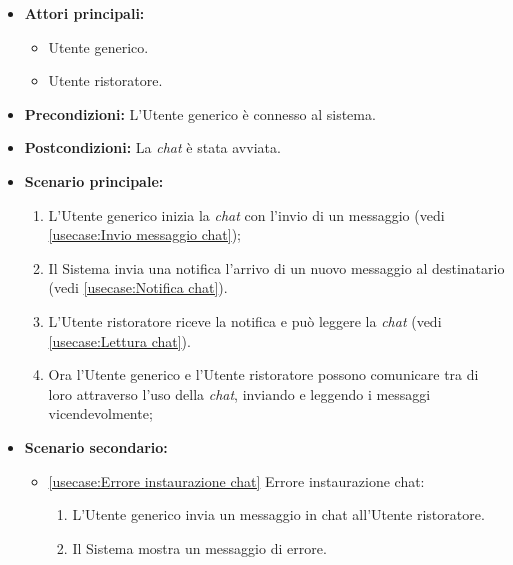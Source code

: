 \label{usecase:Chat Utente generico}
\begin{itemize}
	\item \textbf{Attori principali:} 
	\begin{itemize}
        \item Utente generico.
        \item Utente ristoratore.
    \end{itemize}

	\item \textbf{Precondizioni:} L'Utente generico è connesso al sistema.


	\item \textbf{Postcondizioni:} La \textit{chat} è stata avviata.

	\item \textbf{Scenario principale:}
            \begin{enumerate}
                \item L'Utente generico inizia la \textit{chat} con l'invio di un messaggio (vedi \autoref{usecase:Invio messaggio chat});
                \item Il Sistema invia una notifica l'arrivo di un nuovo messaggio al destinatario (vedi \autoref{usecase:Notifica chat}).
                \item L'Utente ristoratore riceve la notifica e può leggere la \textit{chat} (vedi \autoref{usecase:Lettura chat}).
                \item Ora l'Utente generico e l'Utente ristoratore possono comunicare tra di loro attraverso l'uso della \textit{chat}, inviando e leggendo i messaggi vicendevolmente;
	      \end{enumerate}

    \item \textbf{Scenario secondario:}
		  \begin{itemize}
			  \item \autoref{usecase:Errore instaurazione chat} Errore instaurazione chat:
				\begin{enumerate}
					\item L'Utente generico invia un messaggio in chat all'Utente ristoratore.
					\item  Il Sistema mostra un messaggio di errore.
				\end{enumerate}
		  \end{itemize}
\end{itemize}